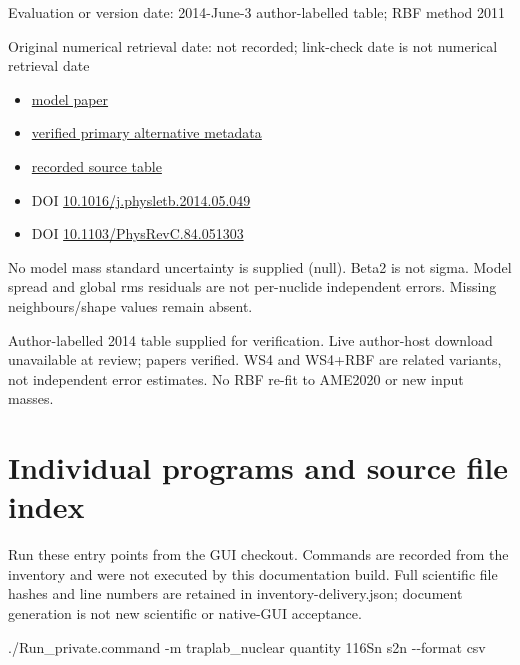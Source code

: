 \documentclass[
  11pt,
  letterpaper,
]{article}
\newenvironment{Shaded}{}{}
\newcommand{\AttributeTok}[1]{\textcolor[rgb]{0.49,0.56,0.16}{#1}}
\newcommand{\ExtensionTok}[1]{#1}
\newcommand{\NormalTok}[1]{#1}
\providecommand{\tightlist}{%
  \setlength{\itemsep}{0pt}\setlength{\parskip}{0pt}}
\begin{document}
Evaluation or version date: 2014-June-3 author-labelled table; RBF
method 2011

Original numerical retrieval date: not recorded; link-check date is not
numerical retrieval date

\begin{itemize}
\tightlist
\item
  \href{https://doi.org/10.1016/j.physletb.2014.05.049}{model paper}
\item
  \href{https://journals.aps.org/prc/abstract/10.1103/PhysRevC.84.051303}{verified
  primary alternative metadata}
\item
  \href{http://www.imqmd.com/mass/}{recorded source table}
\item
  DOI
  \href{https://doi.org/10.1016/j.physletb.2014.05.049}{10.1016/j.physletb.2014.05.049}
\item
  DOI
  \href{https://doi.org/10.1103/PhysRevC.84.051303}{10.1103/PhysRevC.84.051303}
\end{itemize}

No model mass standard uncertainty is supplied (null). Beta2 is not
sigma. Model spread and global rms residuals are not per-nuclide
independent errors. Missing neighbours/shape values remain absent.

Author-labelled 2014 table supplied for verification. Live author-host
download unavailable at review; papers verified. WS4 and WS4+RBF are
related variants, not independent error estimates. No RBF re-fit to
AME2020 or new input masses.

\section{Individual programs and source file
index}\label{individual-programs-and-source-file-index}

Run these entry points from the GUI checkout. Commands are recorded from
the inventory and were not executed by this documentation build. Full
scientific file hashes and line numbers are retained in
inventory-delivery.json; document generation is not new scientific or
native-GUI acceptance.

\begin{Shaded}
\begin{Highlighting}[]
\ExtensionTok{./Run\_private.command} \AttributeTok{{-}m}\NormalTok{ traplab\_nuclear quantity 116Sn s2n }\AttributeTok{{-}{-}format}\NormalTok{ csv}
\end{Highlighting}
\end{Shaded}
\end{document}
